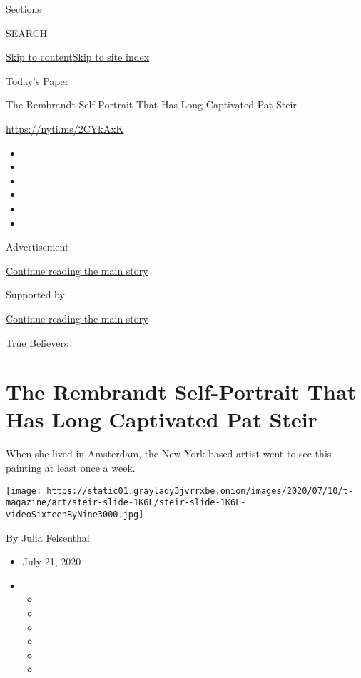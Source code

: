 Sections

SEARCH

\protect\hyperlink{site-content}{Skip to
content}\protect\hyperlink{site-index}{Skip to site index}

\href{https://myaccount.nytimes3xbfgragh.onion/auth/login?response_type=cookie\&client_id=vi}{}

\href{https://www.nytimes3xbfgragh.onion/section/todayspaper}{Today's
Paper}

The Rembrandt Self-Portrait That Has Long Captivated Pat Steir

\url{https://nyti.ms/2CYkAxK}

\begin{itemize}
\item
\item
\item
\item
\item
\item
\end{itemize}

Advertisement

\protect\hyperlink{after-top}{Continue reading the main story}

Supported by

\protect\hyperlink{after-sponsor}{Continue reading the main story}

True Believers

\hypertarget{the-rembrandt-self-portrait-that-has-long-captivated-pat-steir}{%
\section{The Rembrandt Self-Portrait That Has Long Captivated Pat
Steir}\label{the-rembrandt-self-portrait-that-has-long-captivated-pat-steir}}

When she lived in Amsterdam, the New York-based artist went to see this
painting at least once a week.

\texttt{[image: https://static01.graylady3jvrrxbe.onion/images/2020/07/10/t-magazine/art/steir-slide-1K6L/steir-slide-1K6L-videoSixteenByNine3000.jpg]}

By Julia Felsenthal

\begin{itemize}
\item
  July 21, 2020
\item
  \begin{itemize}
  \item
  \item
  \item
  \item
  \item
  \item
  \end{itemize}
\end{itemize}

